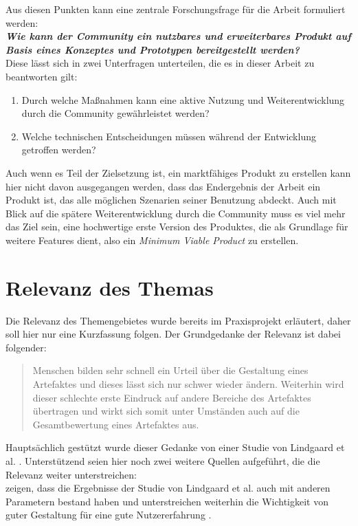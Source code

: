 
Aus diesen Punkten kann eine zentrale Forschungsfrage für die Arbeit formuliert werden:\\

\textit{\textbf{Wie kann der Community ein nutzbares und erweiterbares Produkt auf Basis eines Konzeptes und Prototypen bereitgestellt werden?}}\\

Diese lässt sich in zwei Unterfragen unterteilen, die es in dieser Arbeit zu beantworten gilt:
\begin{enumerate}
  \item Durch welche Maßnahmen kann eine aktive Nutzung und Weiterentwicklung durch die Community gewährleistet werden?
  \item Welche technischen Entscheidungen müssen während der Entwicklung getroffen werden?
\end{enumerate}

Auch wenn es Teil der Zielsetzung ist, ein marktfähiges Produkt zu erstellen kann hier nicht davon ausgegangen werden, dass das Endergebnis der Arbeit ein Produkt ist, das alle möglichen Szenarien seiner Benutzung abdeckt. Auch mit Blick auf die spätere Weiterentwicklung durch die Community muss es viel mehr das Ziel sein, eine hochwertige erste Version des Produktes, die als Grundlage für weitere Features dient, also ein \textit{Minimum Viable Product} zu erstellen.


\section{Relevanz des Themas}
\label{sec:relevance}
Die Relevanz des Themengebietes wurde bereits im Praxisprojekt erläutert, daher soll hier nur eine Kurzfassung folgen. Der Grundgedanke der Relevanz ist dabei folgender:

\begin{quote}
  Menschen bilden sehr schnell ein Urteil über die Gestaltung eines Artefaktes und dieses lässt sich nur schwer wieder ändern. Weiterhin wird dieser schlechte erste Eindruck auf andere Bereiche des Artefaktes übertragen und wirkt sich somit unter Umständen auch auf die Gesamtbewertung eines Artefaktes aus. \cite{PoplawskiPP}
\end{quote}

Hauptsächlich gestützt wurde dieser Gedanke von einer Studie von Lindgaard et al. \cite{lindgaard2006attention}. Unterstützend seien hier noch zwei weitere Quellen aufgeführt, die die Relevanz weiter unterstreichen:\\
\cite{tractinsky2006evaluating} zeigen, dass die Ergebnisse der Studie von Lindgaard et al. auch mit anderen Parametern bestand haben und unterstreichen weiterhin die Wichtigkeit von guter Gestaltung für eine gute Nutzererfahrung \cite{tractinsky2000beautiful}.

